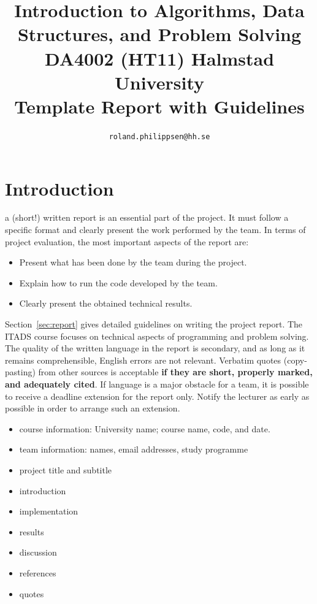 \documentclass[a4paper,10pt]{article}
\begin{document}
\title{
  {\normalsize
    Introduction to Algorithms, Data Structures, and Problem Solving\\
    DA4002 (HT11) Halmstad University}\\
  Template Report with Guidelines\\
}
\author{
  \texttt{roland.philippsen@hh.se}
}
\maketitle



\section{Introduction}

a (short!) written report is an essential part of the project.
It must follow a specific format and clearly present the work performed by the team.
In terms of project evaluation, the most important aspects of the report are:
\begin{itemize}
\item Present what has been done by the team during the project.
\item Explain how to run the code developed by the team.
\item Clearly present the obtained technical results.
\end{itemize}
Section~\ref{sec:report} gives detailed guidelines on writing the project report.
The ITADS course focuses on technical aspects of programming and problem solving.
The quality of the written language in the report is secondary, and as long as it remains comprehensible, English errors are not relevant.
Verbatim quotes (copy-pasting) from other sources is acceptable \textbf{if they are short, properly marked, and adequately cited}.
If language is a major obstacle for a team, it is possible to receive a deadline extension for the report only.
Notify the lecturer as early as possible in order to arrange such an extension.

\begin{itemize}
\item course information: University name; course name, code, and date.
\item team information: names, email addresses, study programme
\item project title and subtitle
\item introduction
\item implementation
\item results
\item discussion
\item references
\item quotes
\end{itemize}
\end{document}

